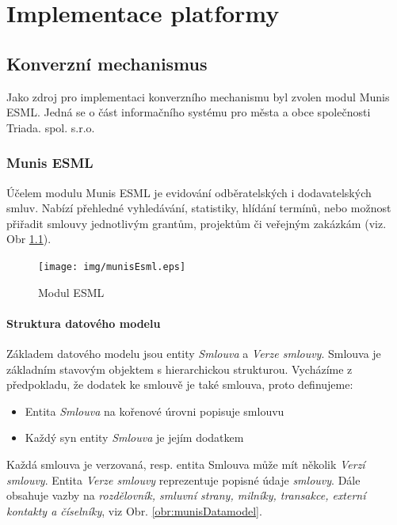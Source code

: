 \chapter{Implementace platformy}

\section{Konverzní mechanismus}

Jako zdroj pro implementaci konverzního mechanismu byl zvolen modul Munis ESML. Jedná se o část informačního systému pro města a obce společnosti Triada. spol. s.r.o.

\subsection{Munis ESML}

Účelem modulu Munis ESML je evidování odběratelských i dodavatelských smluv. Nabízí přehledné vyhledávání, statistiky, hlídání termínů, nebo možnost přiřadit smlouvy jednotlivým grantům, projektům či veřejným zakázkám (viz. Obr \ref{obr:munisEsml}).

\begin{figure}[H]
\centerline{\texttt{[image: img/munisEsml.eps]}}
\caption{Modul ESML}
\label{obr:munisEsml}
\end{figure}

\newpage

\subsubsection{Struktura datového modelu}

Základem datového modelu jsou entity \textit{Smlouva} a \textit{Verze smlouvy}. Smlouva je základním stavovým objektem s hierarchickou strukturou. Vycházíme z předpokladu, že dodatek ke smlouvě je také smlouva, proto definujeme:

\begin{itemize}
\item Entita \textit{Smlouva} na kořenové úrovni popisuje smlouvu
\item Každý syn entity \textit{Smlouva} je jejím dodatkem
\end{itemize}

Každá smlouva je verzovaná, resp. entita Smlouva může mít několik \textit{Verzí smlouvy}. Entita \textit{Verze smlouvy} reprezentuje popisné údaje \textit{smlouvy}. Dále obsahuje vazby na \textit{rozdělovník, smluvní strany, milníky, transakce, externí kontakty a číselníky}, viz Obr. \ref{obr:munisDatamodel}.

